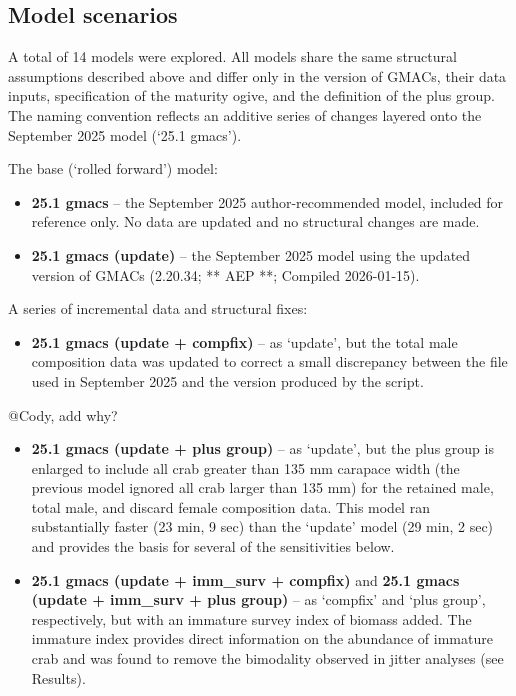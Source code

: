 \documentclass[
]{article}
\providecommand{\tightlist}{%
  \setlength{\itemsep}{0pt}\setlength{\parskip}{0pt}}
\begin{document}
\subsection{Model scenarios}\label{model-scenarios}

A total of 14 models were explored. All models share the same structural assumptions described above and differ only in the version of GMACs, their data inputs, specification of the maturity ogive, and the definition of the plus group. The naming convention reflects an additive series of changes layered onto the September 2025 model (`25.1 gmacs').

The base (`rolled forward') model:

\begin{itemize}
\item
  \textbf{25.1 gmacs} -- the September 2025 author-recommended model, included for reference only. No data are updated and no structural changes are made.
\item
  \textbf{25.1 gmacs (update)} -- the September 2025 model using the updated version of GMACs (2.20.34; ** AEP **; Compiled 2026-01-15).
\end{itemize}

A series of incremental data and structural fixes:

\begin{itemize}
\tightlist
\item
  \textbf{25.1 gmacs (update + compfix)} -- as `update', but the total male composition data was updated to correct a small discrepancy between the file used in September 2025 and the version produced by the script.
\end{itemize}

@Cody, add why?

\begin{itemize}
\item
  \textbf{25.1 gmacs (update + plus group)} -- as `update', but the plus group is enlarged to include all crab greater than 135 mm carapace width (the previous model ignored all crab larger than 135 mm) for the retained male, total male, and discard female composition data. This model ran substantially faster (23 min, 9 sec) than the `update' model (29 min, 2 sec) and provides the basis for several of the sensitivities below.
\item
  \textbf{25.1 gmacs (update + imm\_surv + compfix)} and \textbf{25.1 gmacs (update + imm\_surv + plus group)} -- as `compfix' and `plus group', respectively, but with an immature survey index of biomass added. The immature index provides direct information on the abundance of immature crab and was found to remove the bimodality observed in jitter analyses (see Results).
\end{itemize}
\end{document}
